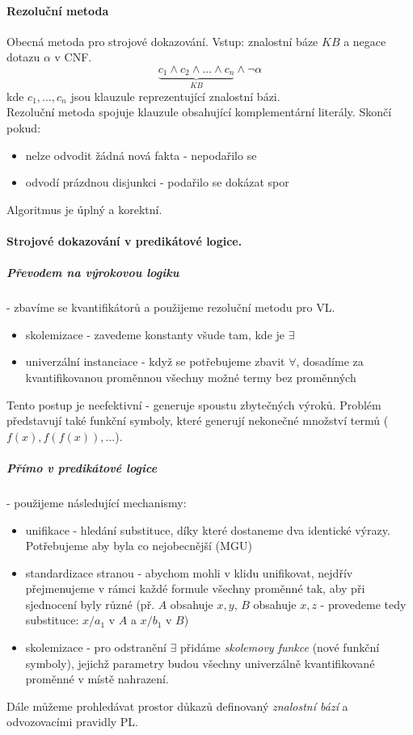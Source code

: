\documentclass[a4paper]{article}      %
\begin{document}
\paragraph{Rezoluční metoda}
Obecná metoda pro strojové dokazování. 
Vstup: znalostní báze $KB$ a negace dotazu $\alpha$ v CNF.
\[
\underbrace{c_1\wedge c_2\wedge\ldots\wedge c_n}_{KB}\wedge \neg \alpha
\]
kde $c_1,\ldots,c_n$ jsou klauzule reprezentující znalostní bázi.\\
Rezoluční metoda spojuje klauzule obsahující komplementární literály.
Skončí pokud:
\begin{itemize}
\item nelze odvodit žádná nová fakta - nepodařilo se
\item odvodí prázdnou disjunkci - podařilo se dokázat spor
\end{itemize}
Algoritmus je úplný a korektní.

\paragraph{Strojové dokazování v predikátové logice.}
\subparagraph{Převodem na výrokovou logiku} - zbavíme se kvantifikátorů a použijeme rezoluční metodu pro VL.
\begin{itemize}
\item skolemizace - zavedeme konstanty všude tam, kde je $\exists$
\item univerzální instanciace - když se potřebujeme zbavit $\forall$, dosadíme za kvantifikovanou proměnnou všechny možné termy bez proměnných
\end{itemize}
Tento postup je neefektivní - generuje spoustu zbytečných výroků. Problém představují také funkční symboly, které generují nekonečné množství termů ($f(x), f(f(x)),\ldots$).

\subparagraph{Přímo v predikátové logice}
- použijeme následující mechanismy:
\begin{itemize}
\item unifikace - hledání substituce, díky které dostaneme dva identické výrazy. Potřebujeme aby byla co nejobecnější (MGU)
\item standardizace stranou - abychom mohli v klidu unifikovat, nejdřív přejmenujeme v rámci každé formule všechny proměnné tak,
aby při sjednocení byly různé (př. $A$ obsahuje $x,y$, $B$ obsahuje $x,z$ - provedeme tedy substituce: $x/a_1$ v $A$ a $x/b_1$ v $B$)
\item skolemizace - pro odstranění $\exists$ přidáme \emph{skolemovy funkce} (nové funkční symboly), jejichž parametry budou všechny univerzálně kvantifikované proměnné v místě nahrazení.
\end{itemize}
Dále můžeme prohledávat prostor důkazů definovaný \emph{znalostní bází} a odvozovacími pravidly PL.
\end{document}
